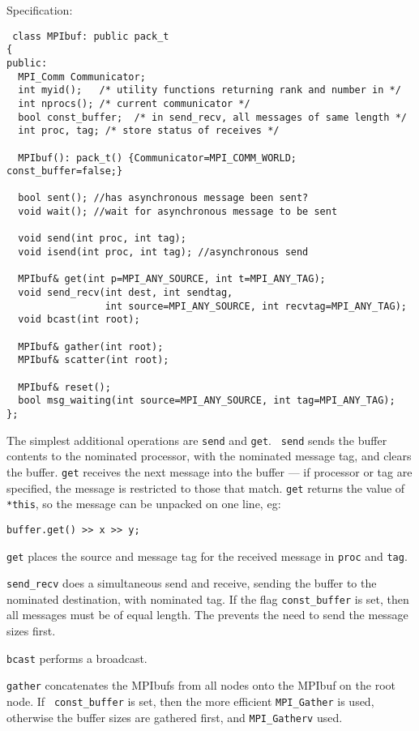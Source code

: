 Specification:
\begin{verbatim}
 class MPIbuf: public pack_t
{
public:
  MPI_Comm Communicator;
  int myid();   /* utility functions returning rank and number in */
  int nprocs(); /* current communicator */
  bool const_buffer;  /* in send_recv, all messages of same length */
  int proc, tag; /* store status of receives */

  MPIbuf(): pack_t() {Communicator=MPI_COMM_WORLD; const_buffer=false;}

  bool sent(); //has asynchronous message been sent?
  void wait(); //wait for asynchronous message to be sent

  void send(int proc, int tag);
  void isend(int proc, int tag); //asynchronous send

  MPIbuf& get(int p=MPI_ANY_SOURCE, int t=MPI_ANY_TAG);
  void send_recv(int dest, int sendtag, 
                 int source=MPI_ANY_SOURCE, int recvtag=MPI_ANY_TAG);
  void bcast(int root);

  MPIbuf& gather(int root);
  MPIbuf& scatter(int root); 

  MPIbuf& reset();
  bool msg_waiting(int source=MPI_ANY_SOURCE, int tag=MPI_ANY_TAG);
};
\end{verbatim}


The simplest additional operations are {\tt send} and {\tt get}. {\tt
  send} sends the buffer contents to the nominated processor, with the
  nominated message tag, and clears the buffer. {\tt get} receives the
  next message into the buffer --- if processor or tag are specified,
  the message is restricted to those that match.
{\tt get} returns the value of \verb+*this+, so the message can be
  unpacked on one line, eg:
\begin{verbatim}
buffer.get() >> x >> y;
\end{verbatim}
  {\tt get} places the source and message tag for the received message
  in {\tt proc} and {\tt tag}.

{\tt send\_recv} does a simultaneous send and
receive, sending the buffer to the nominated destination, with
nominated tag. If the flag {\tt const\_buffer} is
set, then all messages must be of equal length. The prevents the need
to send the message sizes first.

{\tt bcast} performs a broadcast.

{\tt gather} concatenates the MPIbufs from all nodes
onto the MPIbuf on the root node. If {\tt
const\_buffer} is set, then the more efficient
{\tt MPI\_Gather} is used, otherwise the buffer sizes are gathered
first, and {\tt MPI\_Gatherv} used.

